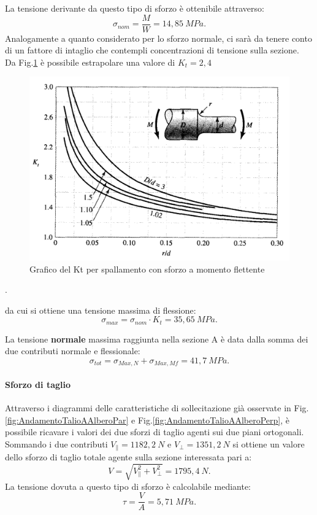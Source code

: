 La tensione derivante da questo tipo di sforzo è ottenibile attraverso:
\begin{equation}
    \sigma_{nom}=\frac{M}{W}=14,85\ MPa.
\end{equation}
Analogamente a quanto considerato per lo sforzo normale, ci sarà da tenere conto di un fattore di intaglio che contempli concentrazioni di tensione sulla sezione. \\
Da Fig.\ref{fig:KtSpallamentoFlettente} è possibile estrapolare una valore di $K_t=2,4$ 
\begin{figure}[h]
    \centering
    \includegraphics[scale=0.3]{Immagini/KtSpallamentoFlettente.png}
    \caption{Grafico del Kt per spallamento con sforzo a momento flettente}
    \label{fig:KtSpallamentoFlettente}
\end{figure}.

 da cui si ottiene una tensione massima di flessione:
 \begin{equation}
     \sigma_{max}=\sigma_{nom}\cdot K_t= 35,65\ MPa.
 \end{equation}
 
 La tensione \textbf{normale} massima raggiunta nella sezione A è data dalla somma dei due contributi normale e flessionale:
\begin{equation}
    \sigma_{tot}=\sigma_{Max,N}+\sigma_{Max,Mf}=41,7\ MPa.
\end{equation}
\paragraph{Sforzo di taglio}
 Attraverso i diagrammi delle caratteristiche di sollecitazione già osservate in Fig.\ref{fig:AndamentoTalioAAlberoPar} e Fig.\ref{fig:AndamentoTalioAAlberoPerp}, è possibile ricavare i valori dei due sforzi di taglio agenti sui due piani ortogonali.\\ 
Sommando i due contributi $V_{\parallel}=1182,2\ N$ e $V_{\perp}=1351,2\ N$ si ottiene un valore dello sforzo di taglio totale agente sulla sezione interessata pari a:
\begin{equation}
    V=\sqrt{V_{\parallel}^2+V_{\perp}^2}=1795,4\ N.
\end{equation}
La tensione dovuta a questo tipo di sforzo è calcolabile mediante:
\begin{equation}
    \tau=\frac{V}{A}=5,71\ MPa.
    \label{tauTaglioA}
\end{equation}
